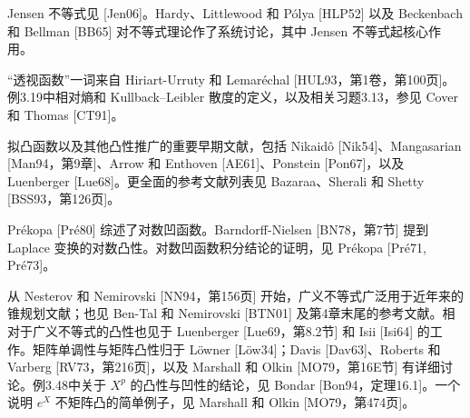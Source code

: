 Jensen 不等式见 [Jen06]。Hardy、Littlewood 和 Pólya [HLP52] 以及 Beckenbach 和 Bellman [BB65] 对不等式理论作了系统讨论，其中 Jensen 不等式起核心作用。

“透视函数”一词来自 Hiriart-Urruty 和 Lemaréchal [HUL93，第1卷，第100页]。例3.19中相对熵和 Kullback--Leibler 散度的定义，以及相关习题3.13，参见 Cover 和 Thomas [CT91]。

拟凸函数以及其他凸性推广的重要早期文献，包括 Nikaidô [Nik54]、Mangasarian [Man94，第9章]、Arrow 和 Enthoven [AE61]、Ponstein [Pon67]，以及 Luenberger [Lue68]。更全面的参考文献列表见 Bazaraa、Sherali 和 Shetty [BSS93，第126页]。

Prékopa [Pré80] 综述了对数凹函数。Barndorff-Nielsen [BN78，第7节] 提到 Laplace 变换的对数凸性。对数凹函数积分结论的证明，见 Prékopa [Pré71, Pré73]。

从 Nesterov 和 Nemirovski [NN94，第156页] 开始，广义不等式广泛用于近年来的锥规划文献；也见 Ben-Tal 和 Nemirovski [BTN01] 及第4章末尾的参考文献。相对于广义不等式的凸性也见于 Luenberger [Lue69，第8.2节] 和 Isii [Isi64] 的工作。矩阵单调性与矩阵凸性归于 Löwner [Löw34]；Davis [Dav63]、Roberts 和 Varberg [RV73，第216页]，以及 Marshall 和 Olkin [MO79，第16E节] 有详细讨论。例3.48中关于 $X^p$ 的凸性与凹性的结论，见 Bondar [Bon94，定理16.1]。一个说明 $e^X$ 不矩阵凸的简单例子，见 Marshall 和 Olkin [MO79，第474页]。

